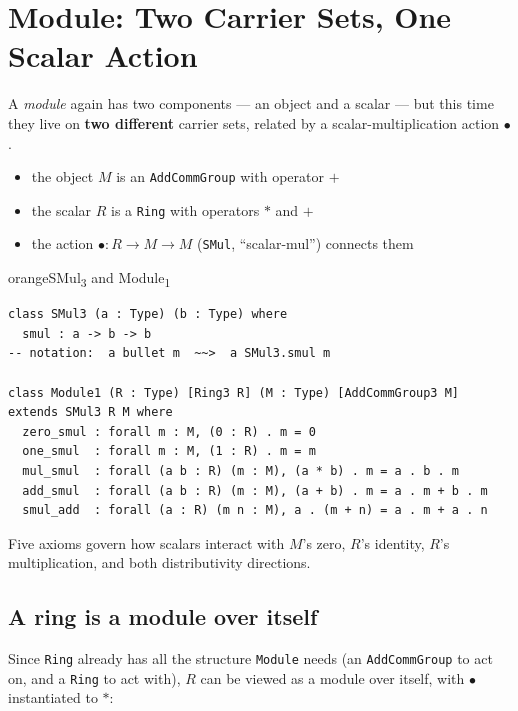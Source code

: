 \documentclass[11pt]{article}
\begin{document}
\section{Module: Two Carrier Sets, One Scalar Action}

A \emph{module} again has two components --- an object and a scalar --- but this time they live on \textbf{two different} carrier sets, related by a scalar-multiplication action $\bullet$.

\begin{itemize}[leftmargin=1.4em,itemsep=1pt]
  \item the object $M$ is an \texttt{AddCommGroup} with operator $+$
  \item the scalar $R$ is a \texttt{Ring} with operators $*$ and $+$
  \item the action $\bullet : R \to M \to M$ (\texttt{SMul}, ``scalar-mul'') connects them
\end{itemize}

\begin{defbox}{orange}{SMul\textsubscript{3} and Module\textsubscript{1}}
\begin{lstlisting}
class SMul3 (a : Type) (b : Type) where
  smul : a -> b -> b
-- notation:  a bullet m  ~~>  a SMul3.smul m

class Module1 (R : Type) [Ring3 R] (M : Type) [AddCommGroup3 M] extends SMul3 R M where
  zero_smul : forall m : M, (0 : R) . m = 0
  one_smul  : forall m : M, (1 : R) . m = m
  mul_smul  : forall (a b : R) (m : M), (a * b) . m = a . b . m
  add_smul  : forall (a b : R) (m : M), (a + b) . m = a . m + b . m
  smul_add  : forall (a : R) (m n : M), a . (m + n) = a . m + a . n
\end{lstlisting}
Five axioms govern how scalars interact with $M$'s zero, $R$'s identity, $R$'s multiplication, and both distributivity directions.
\end{defbox}

\subsection{A ring is a module over itself}

Since \texttt{Ring} already has all the structure \texttt{Module} needs (an \texttt{AddCommGroup} to act on, and a \texttt{Ring} to act with), $R$ can be viewed as a module over itself, with $\bullet$ instantiated to $*$:
\end{document}
